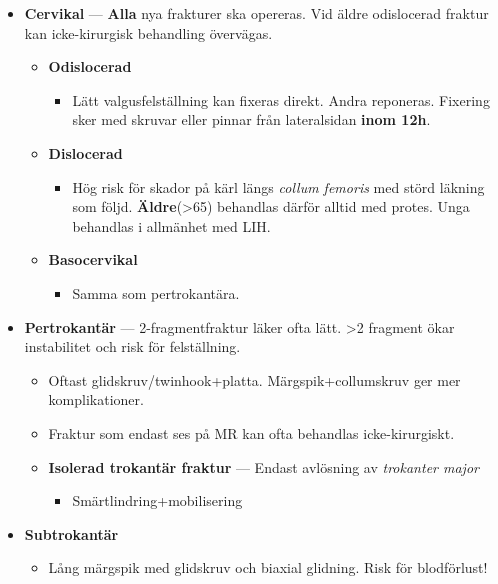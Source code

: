 \documentclass[
  letterpaper,
  DIV=11,
  numbers=noendperiod]{scrreport}
\providecommand{\tightlist}{%
  \setlength{\itemsep}{0pt}\setlength{\parskip}{0pt}}\usepackage{longtable,booktabs,array}
\begin{document}
\begin{itemize}
\tightlist
\item
  \textbf{Cervikal} --- \textbf{Alla} nya frakturer ska opereras. Vid
  äldre odislocerad fraktur kan icke-kirurgisk behandling övervägas.

  \begin{itemize}
  \tightlist
  \item
    \textbf{Odislocerad}

    \begin{itemize}
    \tightlist
    \item
      Lätt valgusfelställning kan fixeras direkt. Andra reponeras.
      Fixering sker med skruvar eller pinnar från lateralsidan
      \textbf{inom 12h}.
    \end{itemize}
  \item
    \textbf{Dislocerad}

    \begin{itemize}
    \tightlist
    \item
      Hög risk för skador på kärl längs \emph{collum femoris} med störd
      läkning som följd. \textbf{Äldre}(\textgreater65) behandlas därför
      alltid med protes. Unga behandlas i allmänhet med LIH.
    \end{itemize}
  \item
    \textbf{Basocervikal}

    \begin{itemize}
    \tightlist
    \item
      Samma som pertrokantära.
    \end{itemize}
  \end{itemize}
\item
  \textbf{Pertrokantär} --- 2-fragmentfraktur läker ofta lätt.
  \textgreater2 fragment ökar instabilitet och risk för felställning.

  \begin{itemize}
  \tightlist
  \item
    Oftast glidskruv/twinhook+platta. Märgspik+collumskruv ger mer
    komplikationer.
  \item
    Fraktur som endast ses på MR kan ofta behandlas icke-kirurgiskt.
  \item
    \textbf{Isolerad trokantär fraktur} --- Endast avlösning av
    \emph{trokanter major}

    \begin{itemize}
    \tightlist
    \item
      Smärtlindring+mobilisering
    \end{itemize}
  \end{itemize}
\item
  \textbf{Subtrokantär}

  \begin{itemize}
  \tightlist
  \item
    Lång märgspik med glidskruv och biaxial glidning. Risk för
    blodförlust!
  \end{itemize}
\end{itemize}
\end{document}
